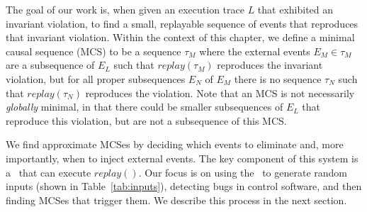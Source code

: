 The goal of our work is, when given an execution trace $L$ that exhibited an
invariant violation, to find a small, replayable sequence of events that reproduces that
invariant violation. Within the context of this chapter, we define a minimal causal sequence (MCS)
to be a sequence $\tau_M$ where the external events $E_M \in \tau_M$ are a
subsequence of $E_L$ such
that $replay(\tau_M)$ reproduces the invariant violation, but for all proper
subsequences $E_N$ of $E_M$
there is no sequence $\tau_N$ such that $replay(\tau_N)$ reproduces the violation.
Note that an MCS is not necessarily {\em globally} minimal, in that there could be smaller
subsequences of $E_L$ that reproduce this violation, but are not a subsequence of this MCS.

We find approximate MCSes by deciding
which events to eliminate and, more importantly, when to inject external
events. The key component of this system is a \tester~that can execute $replay()$.
Our focus is on using the \tester~to generate random inputs (shown in
Table~\ref{tab:inputs}), detecting bugs in control software,
and then finding MCSes that trigger them.
We describe this process in the next section.
